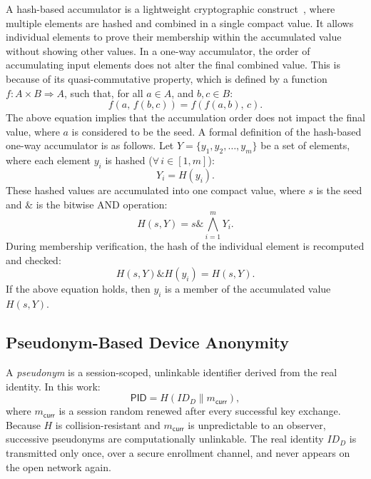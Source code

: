\documentclass[conference]{IEEEtran}
\begin{document}
A hash-based accumulator is a lightweight cryptographic
construct~\cite{weerasena2024acc}, where multiple elements are hashed and
combined in a single compact value.  It allows individual elements to prove
their membership within the accumulated value without showing other values.
In a one-way accumulator, the order of accumulating input elements does not
alter the final combined value.  This is because of its quasi-commutative
property, which is defined by a function $f: A \times B \Rightarrow A$,
such that, for all $a \in A$, and $b, c \in B$:
\begin{equation}
  f(a,\, f(b, c)) = f(f(a, b),\, c).
\end{equation}
The above equation implies that the accumulation order does not impact the
final value, where $a$ is considered to be the seed.  A formal definition
of the hash-based one-way accumulator is as follows.  Let
$Y = \{y_1, y_2, \ldots, y_m\}$ be a set of elements, where each element
$y_i$ is hashed ($\forall\, i \in [1, m]$):
\begin{equation}
  Y_i = H(y_i).
\end{equation}
These hashed values are accumulated into one compact value, where $s$ is the
seed and $\mathbin{\&}$ is the bitwise AND operation:
\begin{equation}
  H(s, Y) = s \mathbin{\&} \textstyle\bigwedge_{i=1}^{m} Y_i.
\end{equation}
During membership verification, the hash of the individual element is
recomputed and checked:
\begin{equation}
  H(s, Y) \mathbin{\&} H(y_i) = H(s, Y).
\end{equation}
If the above equation holds, then $y_i$ is a member of the accumulated
value $H(s, Y)$.

\subsection{Pseudonym-Based Device Anonymity}

A \emph{pseudonym} is a session-scoped, unlinkable identifier derived from
the real identity.  In this work:
\begin{equation}
  \mathsf{PID} = H(ID_D \| m_\mathsf{curr}),
\end{equation}
where $m_\mathsf{curr}$ is a session random renewed after every successful
key exchange.  Because $H$ is collision-resistant and $m_\mathsf{curr}$ is
unpredictable to an observer, successive pseudonyms are computationally
unlinkable.  The real identity $ID_D$ is transmitted only once, over a
secure enrollment channel, and never appears on the open network again.
\end{document}

